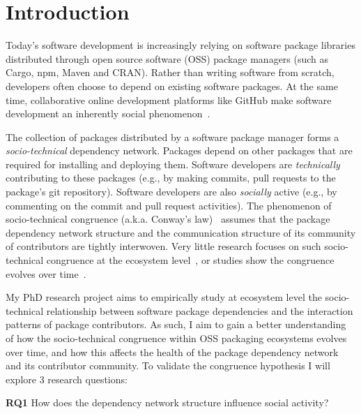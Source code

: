 \section{Introduction}
\label{sec:intro}

Today's software development is increasingly relying on software package libraries distributed through open source software (OSS) package managers (such as Cargo, npm, Maven and CRAN). Rather than writing software from scratch, developers often choose to depend on existing software packages.
At the same time, collaborative online development platforms like GitHub make software development an inherently social phenomenon~\cite{DabbishSTH12,Mens2019IEEESW}.

The collection of packages distributed by a software package manager forms a \emph{socio-technical} dependency network. Packages depend on other packages that are required for installing and deploying them. Software developers are \emph{technically} contributing to these packages (e.g., by making commits, pull requests to the package's git repository). Software developers are also \emph{socially} active (e.g., by commenting on the commit and pull request activities).
The phenomenon of socio-technical congruence (a.k.a. Conway's law)~\cite{Conway1968, Herbsleb1999} assumes
that the package dependency network structure and the communication structure of its community of contributors are tightly interwoven. Very little research focuses on such socio-technical congruence at the ecosystem level~\cite{Palyart2018TSE}, or studies show the congruence evolves over time~\cite{Cataldo2008}.

My PhD research project %
aims to empirically study at ecosystem level the socio-technical relationship between software package dependencies and the interaction patterns of package contributors.
As such, I aim to gain a better understanding of how the socio-technical congruence within OSS packaging ecosystems evolves over time, and how this affects the health of the package dependency network and its contributor community.
To validate the congruence hypothesis %
I will explore 3 research questions: 


\noindent \textbf{RQ1} How does the dependency network structure influence social activity? %

